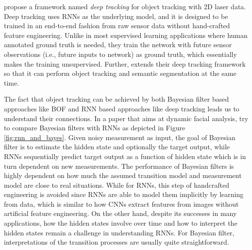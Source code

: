 \citet{ondruska2016deep} propose a framework named \textit{deep tracking} for object tracking with 2D laser data. Deep tracking uses RNNs as the underlying model, and it is designed to be trained in an end-to-end fashion from raw sensor data without hand-crafted feature engineering. Unlike in most supervised learning applications where human annotated ground truth is needed, they train the network with future sensor observations (i.e., future inputs to network) as ground truth, which essentially makes the training unsupervised. Further, \citet{ondruska2016end} extends their deep tracking framework so that it can perform object tracking and semantic segmentation at the same time. 

The fact that object tracking can be achieved by both Bayesian filter based approaches like BOF and RNN based approaches like deep tracking leads us to understand their connections. In a paper that aims at dynamic facial analysis, \citet{de2017dynamic} try to compare Bayesian filters with RNNs as depicted in Figure \ref{fig:rnn_and_bayes}. Given noisy measurement as input, the goal of Bayesian filter is to estimate the hidden state and optionally the target output, while RNNs sequentially predict target output as a function of hidden state which is in turn dependent on new measurements. The performance of Bayesian filters is highly dependent on how much the assumed transition model and measurement model are close to real situations. While for RNNs, this step of handcrafted engineering is avoided since RNNs are able to model them implicitly by learning from data, which is similar to how CNNs extract features from images without artificial feature engineering. On the other hand, despite its successes in many applications, how the hidden states involve over time and how to interpret the hidden states remain a challenge in understanding RNNs. For Bayesian filter, interpretations of the transition processes are usually quite straightforward. 

